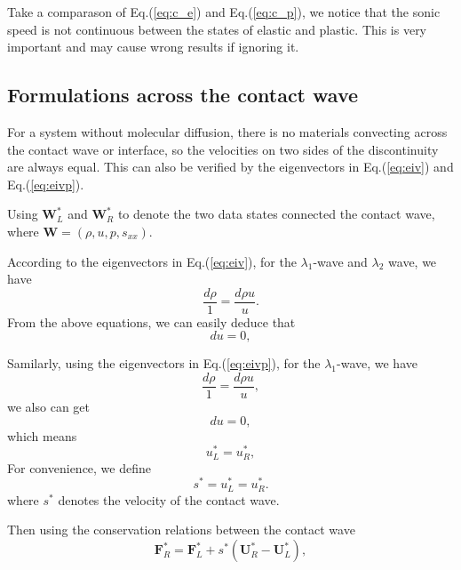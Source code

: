 \documentclass[review]{elsarticle}
\begin{document}
Take a comparason  of Eq.(\ref{eq:c_e}) and Eq.(\ref{eq:c_p}), we notice that the sonic speed is not continuous between the states of elastic and plastic. This is very important and may cause wrong results if ignoring it.   

\subsection{Formulations across the contact wave}\label{sec:contact}
  For  a  system without molecular diffusion, there is no materials convecting  across the contact wave or interface, so the velocities on two sides of  the discontinuity are always equal. %
  This can also be verified by the eigenvectors  in Eq.(\ref{eq:eiv}) and  Eq.(\ref{eq:eivp}).  

Using $\mathbf{W}_L^*$ and $\mathbf{W}_R^*$ to denote the two data states connected the contact wave, where $\mathbf{W}=\left(\rho,u,p,s_{xx}\right)$.

According to  the eigenvectors in  Eq.(\ref{eq:eiv}), for the $\lambda_{1}$-wave and $\lambda_{2}$ wave,  we
have
\begin{equation}   \label{e23a}
\frac{d \rho}{1} = \frac{d \rho u}{u}.
\end{equation}
From the above equations, we can easily deduce that
\begin{equation}   \label{e23b}
du = 0,
\end{equation}

Samilarly, using the eigenvectors in Eq.(\ref{eq:eivp}), for the $\lambda_{1}$-wave, we have 
\begin{equation}  
  \frac{d \rho}{1} = \frac{d \rho u}{u},
\end{equation}
we also can get 
\begin{equation}  
du = 0,
\end{equation}
 which means
\begin{equation}   \label{e23c}
  u_{L}^{\ast}=u_{R}^{\ast},
\end{equation}
For convenience, we define
\begin{equation}\label{eq:contact}
  s^* = u_L^* = u_R^*. %
\end{equation}
where $s^*$ denotes the velocity of the contact wave.

Then using  the  conservation relations between the contact  wave
\begin{equation}\label{eq:RH11}
	\bm{F}_R^* = \bm{F}_L^*+s^*(\bm{U}_R^*-\bm{U}_L^*),
\end{equation}
\end{document}
